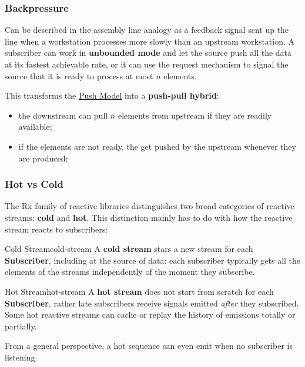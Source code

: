 \subsubsection{Backpressure}\label{sub:rp_backpressure} %
Can be described in the assembly line analogy as a feedback signal sent up the line when a workstation processes more slowly than an upstream workstation.
A subscriber can work in \textbf{unbounded mode} and let the source push all the data at its fastest achievable rate, or it can use the request mechanism to signal the source that it is ready to process at most $n$ elements.
\begin{note}
    This transforms the \hyperref[sub:rp_pull_and_push_models]{Push Model} into a \textbf{push-pull hybrid}:
    \begin{itemize}
        \item the downstream can pull $n$ elements from upstream if they are readily available;
        \item if the elements are not ready, the get pushed by the upstream whenever they are produced;
    \end{itemize}
\end{note}
%
\subsubsection{Hot vs Cold}\label{sub:rp_hot_vs_cold} %
The Rx family of reactive libraries distinguishes two broad categories of reactive streams: \textbf{cold} and \textbf{hot}.
This distinction mainly has to do with how the reactive stream reacts to subscribers:
\begin{definition}{Cold Stream}{cold-stream}
    A \textbf{cold stream} stars a new stream for each \textbf{Subscriber}, including at the source of data: each subscriber typically gets all the elements of the streams independently of the moment they subscribe.
\end{definition}
\begin{definition}{Hot Stream}{hot-stream}
    A \textbf{hot stream} does not start from scratch for each \textbf{Subscriber}, rather late subscribers receive signals emitted \textit{after} they subscribed.
    Some hot reactive streams can cache or replay the history of emissions totally or partially.
    \begin{warning}
        From a general perspective, a hot sequence can even emit when no subscriber is listening
    \end{warning}
\end{definition}
